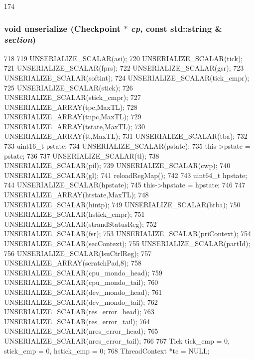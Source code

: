 \begin{DoxyCode}
174 {}
\end{DoxyCode}
\hypertarget{classSparcISA_1_1ISA_af22e5d6d660b97db37003ac61ac4ee49}{
\subsubsection[{unserialize}]{\setlength{\rightskip}{0pt plus 5cm}void unserialize ({\bf Checkpoint} $\ast$ {\em cp}, \/  const std::string \& {\em section})}}
\label{classSparcISA_1_1ISA_af22e5d6d660b97db37003ac61ac4ee49}



\begin{DoxyCode}
718 {
719     UNSERIALIZE_SCALAR(asi);
720     UNSERIALIZE_SCALAR(tick);
721     UNSERIALIZE_SCALAR(fprs);
722     UNSERIALIZE_SCALAR(gsr);
723     UNSERIALIZE_SCALAR(softint);
724     UNSERIALIZE_SCALAR(tick_cmpr);
725     UNSERIALIZE_SCALAR(stick);
726     UNSERIALIZE_SCALAR(stick_cmpr);
727     UNSERIALIZE_ARRAY(tpc,MaxTL);
728     UNSERIALIZE_ARRAY(tnpc,MaxTL);
729     UNSERIALIZE_ARRAY(tstate,MaxTL);
730     UNSERIALIZE_ARRAY(tt,MaxTL);
731     UNSERIALIZE_SCALAR(tba);
732     {
733         uint16_t pstate;
734         UNSERIALIZE_SCALAR(pstate);
735         this->pstate = pstate;
736     }
737     UNSERIALIZE_SCALAR(tl);
738     UNSERIALIZE_SCALAR(pil);
739     UNSERIALIZE_SCALAR(cwp);
740     UNSERIALIZE_SCALAR(gl);
741     reloadRegMap();
742     {
743         uint64_t hpstate;
744         UNSERIALIZE_SCALAR(hpstate);
745         this->hpstate = hpstate;
746     }
747     UNSERIALIZE_ARRAY(htstate,MaxTL);
748     UNSERIALIZE_SCALAR(hintp);
749     UNSERIALIZE_SCALAR(htba);
750     UNSERIALIZE_SCALAR(hstick_cmpr);
751     UNSERIALIZE_SCALAR(strandStatusReg);
752     UNSERIALIZE_SCALAR(fsr);
753     UNSERIALIZE_SCALAR(priContext);
754     UNSERIALIZE_SCALAR(secContext);
755     UNSERIALIZE_SCALAR(partId);
756     UNSERIALIZE_SCALAR(lsuCtrlReg);
757     UNSERIALIZE_ARRAY(scratchPad,8);
758     UNSERIALIZE_SCALAR(cpu_mondo_head);
759     UNSERIALIZE_SCALAR(cpu_mondo_tail);
760     UNSERIALIZE_SCALAR(dev_mondo_head);
761     UNSERIALIZE_SCALAR(dev_mondo_tail);
762     UNSERIALIZE_SCALAR(res_error_head);
763     UNSERIALIZE_SCALAR(res_error_tail);
764     UNSERIALIZE_SCALAR(nres_error_head);
765     UNSERIALIZE_SCALAR(nres_error_tail);
766 
767     Tick tick_cmp = 0, stick_cmp = 0, hstick_cmp = 0;
768     ThreadContext *tc = NULL;
}
\end{DoxyCode}
